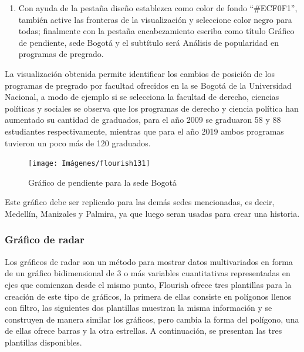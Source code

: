 \documentclass[
]{book}
\providecommand{\tightlist}{%
  \setlength{\itemsep}{0pt}\setlength{\parskip}{0pt}}
\begin{document}
\begin{enumerate}
\def\labelenumi{\arabic{enumi}.}
\setcounter{enumi}{5}
\tightlist
\item
  Con ayuda de la pestaña diseño establezca como color de fondo ``\#ECF0F1'', también active las fronteras de la visualización y seleccione color negro para todas; finalmente con la pestaña encabezamiento escriba como título Gráfico de pendiente, sede Bogotá y el subtítulo será Análisis de popularidad en programas de pregrado.
\end{enumerate}

La visualización obtenida permite identificar los cambios de posición de los programas de pregrado por facultad ofrecidos en la se Bogotá de la Universidad Nacional, a modo de ejemplo si se selecciona la facultad de derecho, ciencias políticas y sociales se observa que los programas de derecho y ciencia política han aumentado su cantidad de graduados, para el año 2009 se graduaron 58 y 88 estudiantes respectivamente, mientras que para el año 2019 ambos programas tuvieron un poco más de 120 graduados.

\begin{figure}

{\centering \texttt{[image: Imágenes/flourish131]} 

}

\caption{Gráfico de pendiente para la sede Bogotá}\label{fig:pendientesedebogotaflourish-fig}
\end{figure}

Este gráfico debe ser replicado para las demás sedes mencionadas, es decir, Medellín, Manizales y Palmira, ya que luego seran usadas para crear una historia.

\hypertarget{graficoradarflourish}{%
\subsubsection{Gráfico de radar}\label{graficoradarflourish}}

Los gráficos de radar son un método para mostrar datos multivariados en forma de un gráfico bidimensional de 3 o más variables cuantitativas representadas en ejes que comienzan desde el mismo punto, Flourish ofrece tres plantillas para la creación de este tipo de gráficos, la primera de ellas consiste en polígonos llenos con filtro, las siguientes dos plantillas muestran la misma información y se construyen de manera similar los gráficos, pero cambia la forma del polígono, una de ellas ofrece barras y la otra estrellas. A continuación, se presentan las tres plantillas disponibles.
\end{document}
